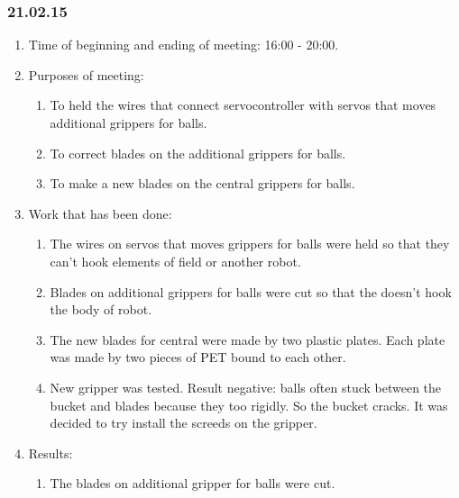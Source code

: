 \subsubsection{21.02.15}
\begin{enumerate}
	
	\item Time of beginning and ending of meeting: 16:00 - 20:00.
	
	\item Purposes of meeting: 
	\begin{enumerate}
		
		\item To held the wires that connect servocontroller with servos that moves additional grippers for balls.
		
		\item To correct blades on the additional grippers for balls.
		
		\item To make a new blades on the central  grippers for balls.
		
	\end{enumerate}

	\item Work that has been done:
	\begin{enumerate}
		
		\item The wires on servos that moves grippers for balls were held so that they can't hook elements of field or another robot.
		
		\item Blades on additional grippers for balls were cut so that the doesn't hook the body of robot.
		
		\item The new blades for central were made by two plastic plates. Each plate was made by two pieces of PET bound to each other.
		
		\item New gripper was tested. Result negative: balls often stuck between the bucket and blades because they too rigidly. So the bucket cracks. It was decided to try install the screeds on the gripper.
		
	\end{enumerate}
	
	\item  Results:
	\begin{enumerate}
		
		\item The blades on additional gripper for balls were cut.
		

\end{enumerate}
\end{enumerate}
